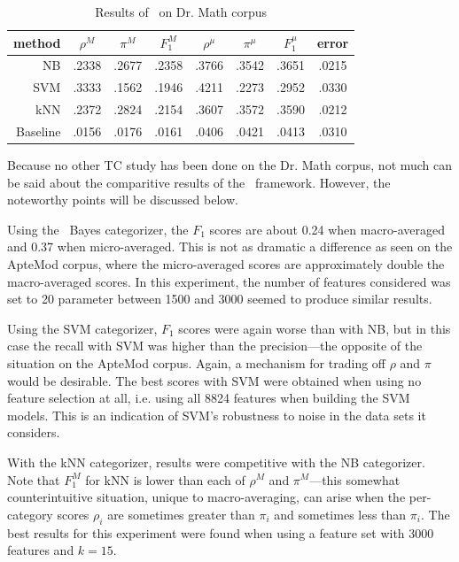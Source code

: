 \begin{table}
\begin{center}
\begin{tabular}{|r c c c c c c c|}
\hline
method    & $\rho^M$ & $\pi^M$ & $F_1^M$ & $\rho^\mu$ & $\pi^\mu$ & $F_1^\mu$ &   error \\
\hline
NB        &   .2338  &  .2677  &  .2358  &  .3766     &  .3542    &  .3651    &  .0215  \\
SVM       &   .3333  &  .1562  &  .1946  &  .4211     &  .2273    &  .2952    &  .0330  \\
kNN       &   .2372  &  .2824  &  .2154  &  .3607     &  .3572    &  .3590    &  .0212  \\
Baseline  &   .0156  &  .0176  &  .0161  &  .0406     &  .0421    &  .0413    &  .0310  \\
\hline
\end{tabular}
\end{center}
\caption{Results of \aicat\ on Dr. Math corpus}
\label{drmath-results}
\end{table}

Because no other TC study has been done on the Dr. Math corpus, not
much can be said about the comparitive results of the \aicat\
framework.  However, the noteworthy points will be discussed below.

Using the \naive\ Bayes categorizer, the $F_1$ scores are about 0.24
when macro-averaged and 0.37 when micro-averaged.  This is not as
dramatic a difference as seen on the ApteMod corpus, where the
micro-averaged scores are approximately double the macro-averaged
scores.  In this experiment, the number of features considered was set
to 20%
parameter between 1500 and 3000 seemed to produce similar results.

Using the SVM categorizer, $F_1$ scores were again worse than with NB,
but in this case the recall with SVM was higher than the
precision---the opposite of the situation on the ApteMod corpus.
Again, a mechanism for trading off $\rho$ and $\pi$ would be
desirable.  The best scores with SVM were obtained when using no
feature selection at all, i.e. using all 8824 features when building
the SVM models.  This is an indication of SVM's robustness to noise in
the data sets it considers.

With the kNN categorizer, results were competitive with the NB
categorizer.  Note that $F_1^M$ for kNN is lower than each of $\rho^M$
and $\pi^M$---this somewhat counterintuitive situation, unique to
macro-averaging, can arise when the per-category scores $\rho_i$ are
sometimes greater than $\pi_i$ and sometimes less than $\pi_i$.  The
best results for this experiment were found when using a feature set
with 3000 features and $k=15$.


